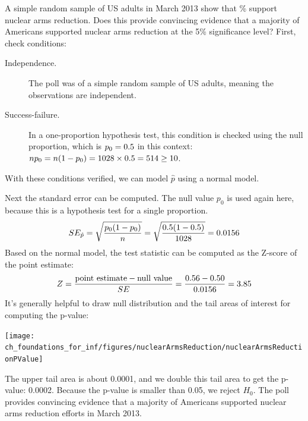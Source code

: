 \begin{examplewrap}
\begin{nexample}{A simple random sample of
    \gallupnucleararmspollsize{} US adults
    in March 2013 show that
    \gallupnucleararmspollpercent{}\% support nuclear arms
    reduction.
    Does this provide convincing evidence that a majority
    of Americans supported nuclear arms reduction at the
    5\% significance level?} \label{NuclearArmsInferenceExample}
  First, check conditions:
  \begin{description}
  \item[Independence.] The poll was of a simple random sample
      of US adults, meaning the observations are independent.
  \item[Success-failure.] In a one-proportion hypothesis test,
      this condition is checked using the null proportion,
      which is $p_0 = 0.5{}$
      in this context:
      $n p_0 = n (1 - p_0)
          = 1028{} \times
              0.5{}
          = 514{} \geq 10$.
  \end{description}
  With these conditions verified,
  we can model $\hat{p}$ using a normal model.

  Next the standard error can be computed.
  The null value $p_0$ is used again here,
  because this is a hypothesis test for a single proportion.
  \begin{align*}
  SE_{\hat{p}}
      = \sqrt{\frac{p_0 (1 - p_0)}{n}}
      = \sqrt{\frac{0.5{}
          (1 - 0.5{})}
          {1028{}}}
      = 0.0156{}
  \end{align*}
  Based on the normal model, the test statistic can be
  computed as the Z-score of the point estimate:
  \begin{align*}
  Z = \frac{\text{point estimate} - \text{null value}}{SE}
      = \frac{0.56{} - 0.50}
          {0.0156{}}
      = 3.85
  \end{align*}
  It's generally helpful to draw null distribution and
  the tail areas of interest for computing the p-value:
  \begin{center}
  \texttt{[image: ch\_foundations\_for\_inf/figures/nuclearArmsReduction/nuclearArmsReductionPValue]}
  \end{center}
  The upper tail area is about 0.0001,
  and we double this tail area to get the p-value: 0.0002.
  Because the p-value is smaller than 0.05, we reject $H_0$.
  The poll provides convincing evidence that a majority
  of Americans supported nuclear arms reduction efforts
  in March 2013.
\end{nexample}
\end{examplewrap}

